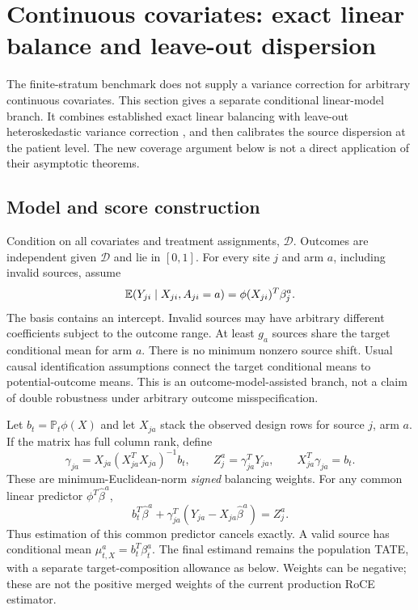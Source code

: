 \section{Continuous covariates: exact linear balance and leave-out dispersion}
\label{sec:continuous-balance}

The finite-stratum benchmark does not supply a variance correction for
arbitrary continuous covariates. This section gives a separate conditional
linear-model branch. It combines established exact linear balancing with
leave-out heteroskedastic variance correction \citep{arb2018,kss2020}, and
then calibrates the source dispersion at the patient level. The new coverage
argument below is not a direct application of their asymptotic theorems.

\subsection{Model and score construction}

Condition on all covariates and treatment assignments, $\mathcal D$. Outcomes
are independent given $\mathcal D$ and lie in $[0,1]$. For every site $j$ and
arm $a$, including invalid sources, assume
\[
 \mathbb E(Y_{ji}\mid X_{ji},A_{ji}=a)=\phi(X_{ji})^T\beta_j^a.
\]
The basis contains an intercept. Invalid sources may have arbitrary different
coefficients subject to the outcome range. At least $g_a$ sources share the
target conditional mean for arm $a$. There is no minimum nonzero source shift.
Usual causal identification assumptions connect the target conditional means
to potential-outcome means. This is an outcome-model-assisted branch, not a
claim of double robustness under arbitrary outcome misspecification.

Let $b_t=\mathbb P_t\phi(X)$ and let $X_{ja}$ stack the observed design rows
for source $j$, arm $a$. If the matrix has full column rank, define
\[
 \gamma_{ja}=X_{ja}(X_{ja}^TX_{ja})^{-1}b_t,\qquad
 Z_j^a=\gamma_{ja}^TY_{ja},\qquad X_{ja}^T\gamma_{ja}=b_t.
\]
These are minimum-Euclidean-norm \emph{signed} balancing weights. For any
common linear predictor $\phi^T\widehat\beta^a$,
\[
 b_t^T\widehat\beta^a+
 \gamma_{ja}^T(Y_{ja}-X_{ja}\widehat\beta^a)=Z_j^a.
\]
Thus estimation of this common predictor cancels exactly. A valid source has
conditional mean $\mu_{t,X}^a=b_t^T\beta_t^a$. The final estimand remains the
population TATE, with a separate target-composition allowance as below.
Weights can be negative; these are not the positive merged weights of the
current production RoCE estimator.

